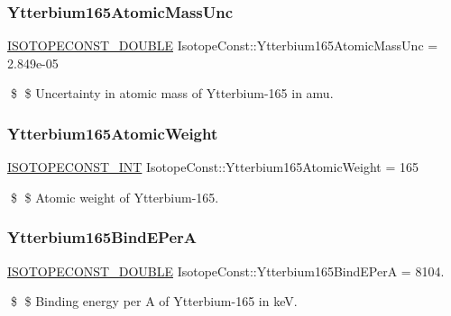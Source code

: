 \subsubsection{\texorpdfstring{Ytterbium165\+Atomic\+Mass\+Unc}{Ytterbium165AtomicMassUnc}}
{\footnotesize\ttfamily \mbox{\hyperlink{group___isotope_const-_macros_ga8f45a7272ce02c0b4c65c44636ed719a}{I\+S\+O\+T\+O\+P\+E\+C\+O\+N\+S\+T\+\_\+\+D\+O\+U\+B\+LE}} Isotope\+Const\+::\+Ytterbium165\+Atomic\+Mass\+Unc = 2.\+849e-\/05}

\$ \$ Uncertainty in atomic mass of Ytterbium-\/165 in amu. \mbox{\label{group___isotope_const-_ytterbium-_yb165_ga4bf8e5477d3674ecae80b2c2c65906ec}} 
\subsubsection{\texorpdfstring{Ytterbium165\+Atomic\+Weight}{Ytterbium165AtomicWeight}}
{\footnotesize\ttfamily \mbox{\hyperlink{group___isotope_const-_macros_ga5f18360b3e99483a35c32d789e62621c}{I\+S\+O\+T\+O\+P\+E\+C\+O\+N\+S\+T\+\_\+\+I\+NT}} Isotope\+Const\+::\+Ytterbium165\+Atomic\+Weight = 165}

\$ \$ Atomic weight of Ytterbium-\/165. \mbox{\label{group___isotope_const-_ytterbium-_yb165_ga3f8323ff0ca9be5c598f7405347f95ad}} 
\subsubsection{\texorpdfstring{Ytterbium165\+Bind\+E\+PerA}{Ytterbium165BindEPerA}}
{\footnotesize\ttfamily \mbox{\hyperlink{group___isotope_const-_macros_ga8f45a7272ce02c0b4c65c44636ed719a}{I\+S\+O\+T\+O\+P\+E\+C\+O\+N\+S\+T\+\_\+\+D\+O\+U\+B\+LE}} Isotope\+Const\+::\+Ytterbium165\+Bind\+E\+PerA = 8104.}

\$ \$ Binding energy per A of Ytterbium-\/165 in keV. \mbox{\label{group___isotope_const-_ytterbium-_yb165_ga21dd5dc5689ec15fd67810cf8f1dc78d}} 
